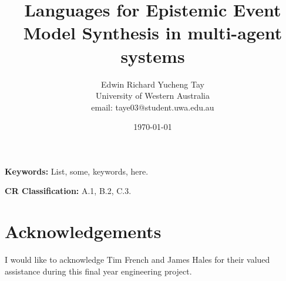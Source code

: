 \documentclass[12pt,a4paper]{article}
\title{Languages for Epistemic Event Model Synthesis in multi-agent systems}
\author{Edwin Richard Yucheng Tay \\
University of Western Australia \\
email: taye03@student.uwa.edu.au }
\date{\today}
\begin{document}
\maketitle

\begin{abstract}


\end{abstract}

{\bf Keywords:} List, some, keywords, here.

{\bf CR Classification:} A.1, B.2, C.3.






\section*{Acknowledgements}

I would like to acknowledge Tim French and James Hales for their valued assistance during this final
year engineering project.



\end{document}
